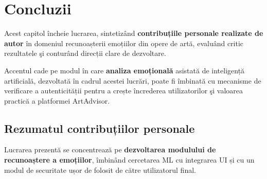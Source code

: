 \chapter{Concluzii}
\label{ch:concluzii}

Acest capitol încheie lucrarea, sintetizând \textbf{contribuțiile personale realizate de autor} în domeniul recunoașterii emoțiilor din opere de artă, evaluând critic rezultatele şi conturând direcții clare de dezvoltare. 

Accentul cade pe modul în care \textbf{analiza emoțională} asistată de inteligență artificială, dezvoltată în cadrul acestei lucrări, poate fi îmbinată cu mecanisme de verificare a autenticității pentru a crește încrederea utilizatorilor şi valoarea practică a platformei ArtAdvisor.

\section{Rezumatul contribuțiilor personale}
Lucrarea prezentă se concentrează pe \textbf{dezvoltarea modulului de recunoaștere a emoțiilor}, îmbinând cercetarea ML cu integrarea UI și cu un modul de securitate ușor de folosit de către utilizatorul final. 

